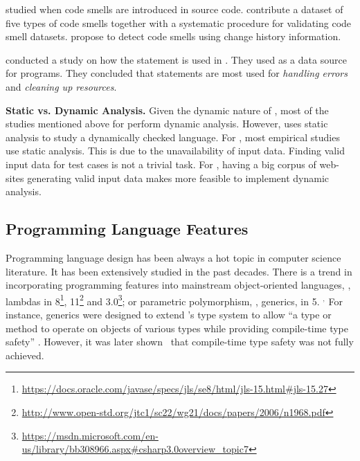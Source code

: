 \cite{tufanoWhenWhyYour2015,tufanoWhenWhyYour2017} studied when code
smells are introduced in source code.
\cite{palombaLandfillOpenDataset2015}
contribute a dataset of five types of code smells together with a systematic procedure for validating code smell datasets.
\cite{palombaDetectingBadSmells2013} propose to detect code smells using change history information.

\cite{nagappanEmpiricalStudyGoto2015} conducted a study on how the
 statement is used in \cc{}.
They used \github{} as a data source for \cc{} programs.
They concluded that  statements are most used for
\emph{handling errors} and \emph{cleaning up resources}.

\textbf{Static vs. Dynamic Analysis.}
Given the dynamic nature of \javascript, most of the studies mentioned
above for \javascript{} perform dynamic analysis.
However, \cite{callauHowWhyDevelopers2013} uses static analysis to study
a dynamically checked language.
For \java{}, most empirical studies use static analysis.
This is due to the unavailability of input data.
Finding valid input data for test cases is not a trivial task.
For \javascript{}, having a big corpus of web-sites generating valid
input data makes more feasible to implement dynamic analysis.

\subsection*{Programming Language Features}

Programming language design has been always a hot topic in computer science literature.
It has been extensively studied in the past decades.
There is a trend in incorporating programming features into mainstream object-oriented languages, \eg,
lambdas in \java{} 8\footnote{\url{https://docs.oracle.com/javase/specs/jls/se8/html/jls-15.html\#jls-15.27}},
\cpp{}11\footnote{\url{http://www.open-std.org/jtc1/sc22/wg21/docs/papers/2006/n1968.pdf}} and
\csharp{} 3.0\footnote{\url{https://msdn.microsoft.com/en-us/library/bb308966.aspx\#csharp3.0overview\_topic7}};
or parametric polymorphism, \ie{}, generics, in \java{} 5.%
%
\(^{,}\)%
For instance, \java{} generics were designed to extend
\java's type system to allow
``a type or method to operate on objects of various types while
providing compile-time type safety''
\citep{Gosling:2013:JLS:2462622}.
However, it was later shown~\citep{aminJavaScalaType2016} that 
compile-time type safety was not fully achieved.

